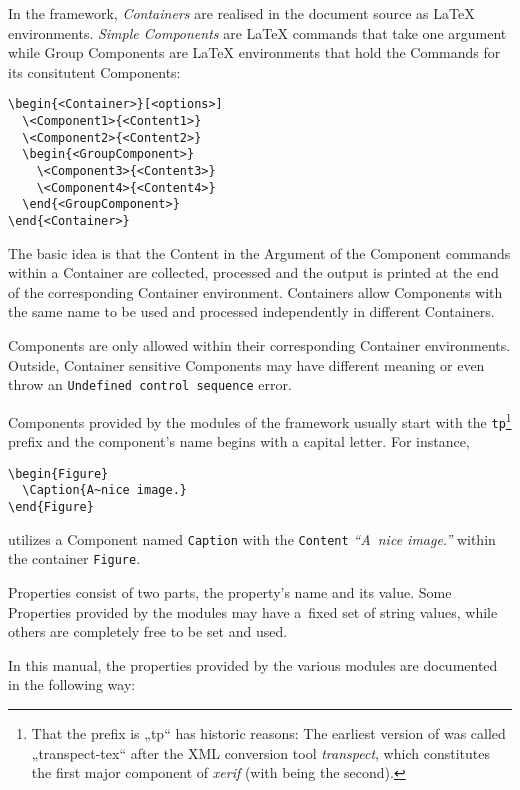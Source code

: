 In the {\CoCoTeX} framework, \textit{Containers} are realised in the
document source as {\LaTeX} environments. \textit{Simple Components}
are {\LaTeX} commands that take one argument while Group Components
are {\LaTeX} environments that hold the Commands for its consitutent
Components:
\begin{lstlisting}[style=tex]
\begin{<Container>}[<options>]
  \<Component1>{<Content1>}
  \<Component2>{<Content2>}
  \begin{<GroupComponent>}
    \<Component3>{<Content3>}
    \<Component4>{<Content4>}
  \end{<GroupComponent>}
\end{<Container>}
\end{lstlisting}

The basic idea is that the Content in the Argument of the
Component commands within a Container are collected,
processed and the output is printed at the end of the corresponding
Container environment. Containers allow Components with the same name
to be used and processed independently in different Containers.

Components are only allowed within their corresponding Container
environments. Outside, Container sensitive Components may have
different meaning or even throw an \texttt{Undefined control sequence}
error.

Components provided by the modules of the {\CoCoTeX} framework usually
start with the \lstinline{tp}\footnote{That the prefix is „tp“ has
  historic reasons: The earliest version of {\CoCoTeX} was called
  „transpect-tex“ after the XML conversion tool \textit{transpect},
  which constitutes the first major component of \textit{xerif} (with
  {\CoCoTeX} being the second).} prefix and the component's name
begins with a capital letter. For instance,
\begin{lstlisting}[style=tex]
\begin{Figure}
  \Caption{A~nice image.}
\end{Figure}
\end{lstlisting}
utilizes a Component named \texttt{Caption} with the \texttt{Content}
\textit{“A~nice image.”} within the container \texttt{Figure}.

Properties consist of two parts, the property's name and its
value. Some Properties provided by the {\CoCoTeX} modules may have
a~fixed set of string values, while others are completely free to be
set and used.

In this manual, the properties provided by the various modules are
documented in the following way:

